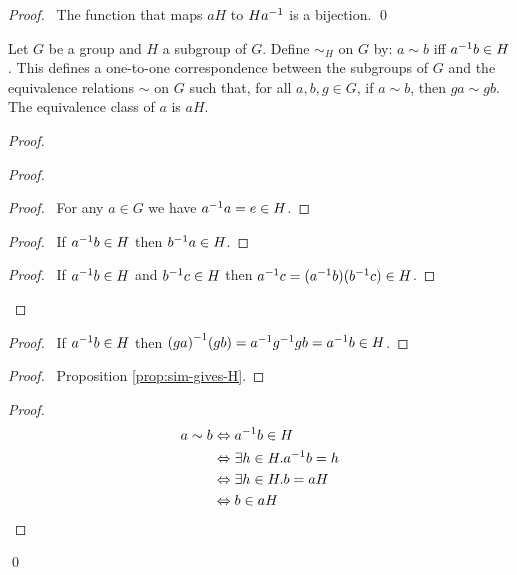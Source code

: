 \begin{proof}
\pf\ The function that maps $aH$ to $H {a}^{-1}$ is a bijection. \qed
\end{proof}

\begin{prop}
Let $G$ be a group and $H$ a subgroup of $G$. Define $\sim_H$ on $G$ by: $a\sim b$ iff ${a}^{-1} b \in H$. This defines a one-to-one correspondence between the subgroups of $G$ and the equivalence relations $\sim$ on $G$ such that, for all $a,b,g \in G$, if $a \sim b$, then $ga \sim gb$. The equivalence class of $a$ is $aH$.
\end{prop}

\begin{proof}
\pf
{}
\begin{proof}
	\begin{proof}
		\pf\ For any $a \in G$ we have ${a}^{-1} a = e \in H$.
	\end{proof}
	\begin{proof}
		\pf\ If ${a}^{-1} b \in H$ then ${b}^{-1} a \in H$.
	\end{proof}
	\begin{proof}
		\pf\ If ${a}^{-1} b \in H$ and ${b}^{-1} c \in H$ then ${a}^{-1} c = ({a}^{-1} b) ({b}^{-1} c) \in H$.
	\end{proof}
\end{proof}
\begin{proof}
	\pf\ If ${a}^{-1} b \in H$ then ${(ga)}^{-1}(gb) = {a}^{-1} {g}^{-1} g b = {a}^{-1} b \in H$.
\end{proof}
\begin{proof}
	\pf\ Proposition \ref{prop:sim-gives-H}.
\end{proof}
\begin{proof}
	\pf
	\begin{align*}
		a \sim b & \Leftrightarrow {a}^{-1} b \in H \\
		& \Leftrightarrow \exists h \in H. {a}^{-1} b = h \\
		& \Leftrightarrow \exists h \in H. b = aH \\
		& \Leftrightarrow b \in aH
	\end{align*}
\end{proof}
\qed
\end{proof}

